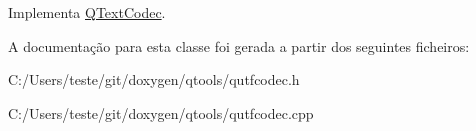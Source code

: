 Implementa \hyperlink{class_q_text_codec_a5bf2c67878639a29dfd3d648b93f17a2}{Q\-Text\-Codec}.



A documentação para esta classe foi gerada a partir dos seguintes ficheiros\-:\begin{DoxyCompactItemize}
\item 
C\-:/\-Users/teste/git/doxygen/qtools/qutfcodec.\-h\item 
C\-:/\-Users/teste/git/doxygen/qtools/qutfcodec.\-cpp\end{DoxyCompactItemize}
